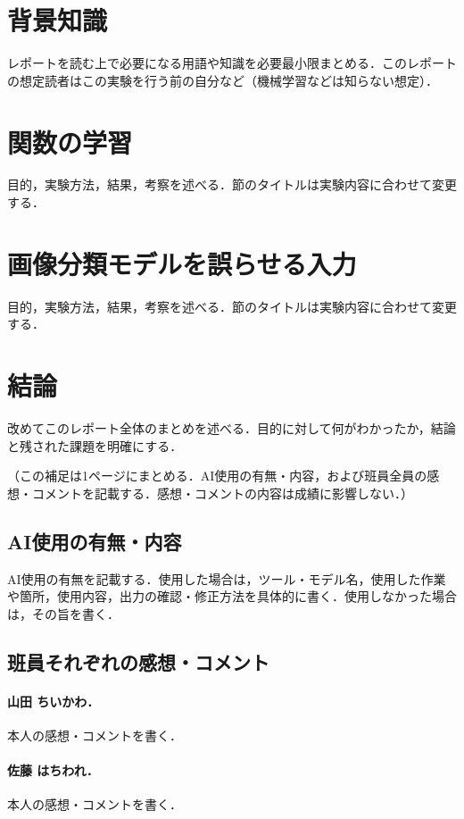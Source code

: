 \documentclass[a4paper,11pt]{article}
\begin{document}
\section{背景知識}\label{sec:background}
レポートを読む上で必要になる用語や知識を必要最小限まとめる．このレポートの想定読者はこの実験を行う前の自分など（機械学習などは知らない想定）．

\section{関数の学習}\label{sec:function-learning}
目的，実験方法，結果，考察を述べる．節のタイトルは実験内容に合わせて変更する．

\section{画像分類モデルを誤らせる入力}\label{sec:adversarial-inputs}
目的，実験方法，結果，考察を述べる．節のタイトルは実験内容に合わせて変更する．

\section{結論}\label{sec:conclusion}
改めてこのレポート全体のまとめを述べる．目的に対して何がわかったか，結論と残された課題を明確にする．

\clearpage
（この補足は1ページにまとめる．AI使用の有無・内容，および班員全員の感想・コメントを記載する．感想・コメントの内容は成績に影響しない．）

\subsection*{AI使用の有無・内容}
AI使用の有無を記載する．使用した場合は，ツール・モデル名，使用した作業や箇所，使用内容，出力の確認・修正方法を具体的に書く．使用しなかった場合は，その旨を書く．

\subsection*{班員それぞれの感想・コメント}
\paragraph{山田 ちいかわ．}本人の感想・コメントを書く．
\paragraph{佐藤 はちわれ．}本人の感想・コメントを書く．
\end{document}
